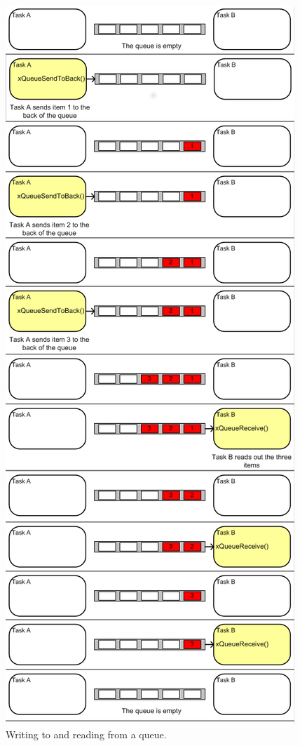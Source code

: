 \begin{center}
 \begin{figure}[H]
	\includegraphics[height=\textheight]{../images/implementation/embedded_server/queue_ipc.png}
	\caption{Writing to and reading from a queue.\cite{FreeRTOS_website}}
	\label{fig:queue_ipc}
 \end{figure}
\end{center}

